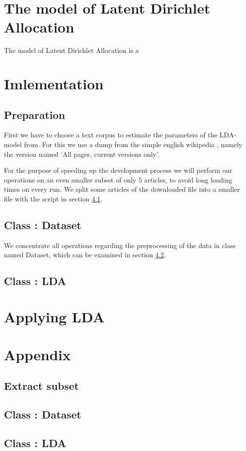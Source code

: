 \documentclass[15pt,landscape,twopage]{article}
\begin{document}
\section{The model of Latent Dirichlet Allocation}
The model of Latent Dirichlet Allocation is a
\section{Imlementation}
\subsection{Preparation}
First we have to choose a text corpus to estimate the parameters of the LDA-model from. For this we use a dump from the simple english wikipedia \cite{simplewi84:online}, namely the version named 'All pages, current versions only'.

For the purpose of speeding up the development process we will perform our operations on an even smaller subset of only 5 articles, to avoid long loading times on every run. We split some articles of the downloaded file into a smaller file with the script in section \ref{extract}.

\subsection{Class : Dataset}
We concentrate all operations regarding the preprocessing of the data in class named Dataset, which can be examined in section  \ref{class:dataset}.

\subsection{Class : LDA}

\section{Applying LDA}
\newpage




\newpage

\section{Appendix}
\subsection{Extract subset} \label{extract}


\subsection{Class : Dataset} \label{class:dataset}


\subsection{Class : LDA} \label{class:lda}

\end{document}

